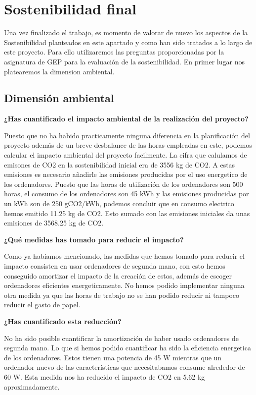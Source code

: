 \section{Sostenibilidad final}

Una vez finalizado el trabajo, es momento de valorar de nuevo los aspectos de la Sostenibilidad planteados en este apartado y como han sido tratados a lo largo de este proyecto. Para ello utilizaremos las preguntas proporcionadas por la asignatura de GEP para la evaluación de la sostenibilidad. En primer lugar nos platearemos la dimension ambiental.

\subsection{Dimensión ambiental}

\textbf{¿Has cuantificado el impacto ambiental de la realización del proyecto?}

Puesto que no ha habido practicamente ninguna diferencia en la planificación del proyecto además de un breve desbalance de las horas empleadas en este, podemos calcular el impacto ambiental del proyecto facilmente. La cifra que calulamos de emisones de CO2 en la sostenibilidad inicial era de 3556 kg de CO2. A estas emisiones es necesario añadirle las emisiones producidas por el uso energetico de los ordenadores. Puesto que las horas de utilización de los ordenadores son 500 horas, el consumo de los ordenadores son 45 kWh y las emisiones producidas por un kWh son de 250 gCO2/kWh, podemos concluir que en consumo electrico hemos emitido 11.25 kg de CO2. Esto sumado con las emisiones iniciales da unas emisiones de 3568.25 kg de CO2.

\textbf{¿Qué medidas has tomado para reducir el impacto?}

Como ya habiamos mencionado, las medidas que hemos tomado para reducir el impacto consisten en usar ordenadores de segunda mano, con esto hemos conseguido amortizar el impacto de la creación de estos, además de escoger ordenadores eficientes energeticamente. No hemos podido implementar ninguna otra medida ya que las horas de trabajo no se han podido reducir ni tampoco reducir el gasto de papel.

\textbf{¿Has cuantificado esta reducción?}

No ha sido posible cuantificar la amortización de haber usado ordenadores de segunda mano. Lo que si hemos podido cuantificar ha sido la eficiencia energetica de los ordenadores. Estos tienen una potencia de 45 W mientras que un ordenador nuevo de las características que necesitabamos consume alrededor de 60 W. Esta medida nos ha reducido el impacto de CO2 en 5.62 kg aproximadamente.

